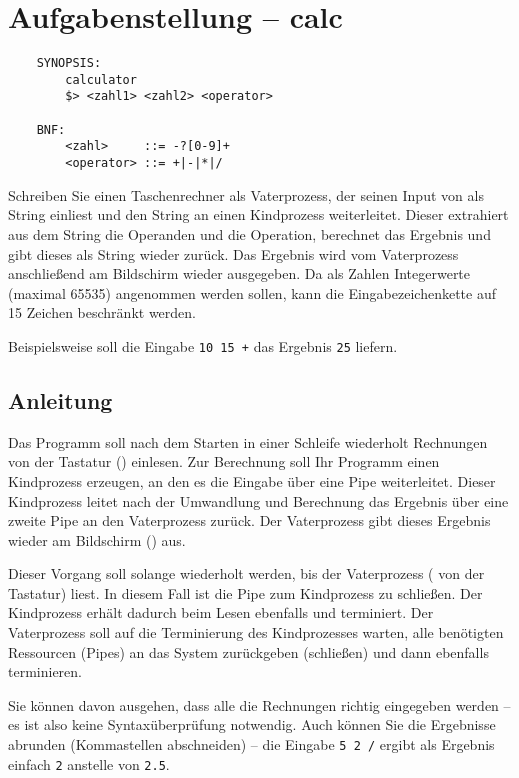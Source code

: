 




\section*{Aufgabenstellung -- calc}

\begin{verbatim}
    SYNOPSIS:
        calculator
        $> <zahl1> <zahl2> <operator>

    BNF:
        <zahl>     ::= -?[0-9]+
        <operator> ::= +|-|*|/
\end{verbatim}

Schreiben Sie einen Taschenrechner als Vaterprozess, der seinen Input
von  als String einliest und den String an einen
Kindprozess weiterleitet. Dieser extrahiert aus dem String die
Operanden und die Operation, berechnet das Ergebnis und gibt dieses
als String wieder zurück. Das Ergebnis wird vom Vaterprozess
anschließend am Bildschirm wieder ausgegeben. Da als Zahlen
Integerwerte (maximal 65535) angenommen werden sollen, kann die
Eingabezeichenkette auf 15 Zeichen beschränkt werden.

Beispielsweise soll die Eingabe \verb_10 15 +_ das Ergebnis \verb_25_
liefern.

\subsection*{Anleitung}

Das Programm soll nach dem Starten in einer Schleife wiederholt
Rechnungen von der Tastatur () einlesen. Zur
Berechnung soll Ihr Programm einen Kindprozess erzeugen, an den
es die Eingabe über eine Pipe weiterleitet. Dieser Kindprozess
leitet nach der Umwandlung und Berechnung das Ergebnis über eine
zweite Pipe an den Vaterprozess zurück. Der Vaterprozess
gibt dieses Ergebnis wieder am Bildschirm () aus.

Dieser Vorgang soll solange wiederholt werden, bis der Vaterprozess
 ( von der Tastatur) liest.
In diesem Fall ist die Pipe zum Kindprozess zu schließen. Der
Kindprozess erhält dadurch beim Lesen ebenfalls 
und terminiert. Der Vaterprozess soll auf die Terminierung des
Kindprozesses warten, alle benötigten Ressourcen (Pipes) an das
System zurückgeben (schließen) und dann ebenfalls terminieren.

Sie können davon ausgehen, dass alle die Rechnungen richtig eingegeben
werden -- es ist also keine Syntaxüberprüfung notwendig. Auch können
Sie die Ergebnisse abrunden (Kommastellen abschneiden) -- die Eingabe
\verb_5 2 /_ ergibt als Ergebnis einfach \verb_2_ anstelle von
\verb_2.5_.

\osueguidelinestwo


